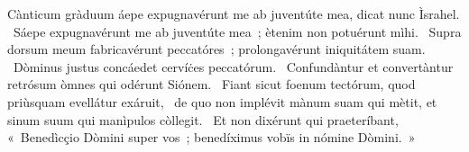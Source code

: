 { Cànticum gràduum}
{%
áepe expugnavérunt me ab juventúte mea, dicat nunc Ìsrahel. 
~Sáepe expugnavérunt me ab juventúte mea~; ètenim non potuérunt mìhi. 
~Supra dorsum meum fabricavérunt peccatóres~; prolongavérunt iniquitátem suam. 
~Dòminus justus concáedet cervíċes peccatórum. 
~Confundàntur et convertàntur retrósum òmnes qui odérunt Siónem. 
~Fiant sicut foenum tectórum, quod priùsquam evellátur exáruit, 
~de quo non implévit mànum suam qui mètit, et sinum suum qui manìpulos còllegit. 
~Et non dixérunt qui praeteríbant, «~Benedìcçio Dòmini super vos~; benedíximus vobïs in nómine Dòmini.~»
}
